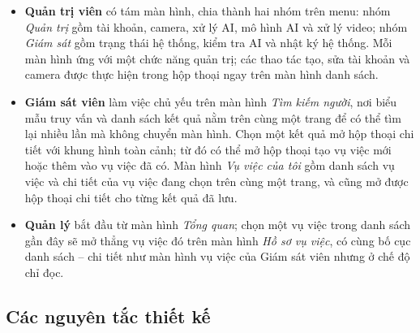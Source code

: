 \begin{itemize}
    \item \textbf{Quản trị viên} có tám màn hình, chia thành hai nhóm trên menu: nhóm \emph{Quản trị} gồm tài khoản, camera, xử lý AI, mô hình AI và xử lý video; nhóm \emph{Giám sát} gồm trạng thái hệ thống, kiểm tra AI và nhật ký hệ thống. Mỗi màn hình ứng với một chức năng quản trị; các thao tác tạo, sửa tài khoản và camera được thực hiện trong hộp thoại ngay trên màn hình danh sách.
    \item \textbf{Giám sát viên} làm việc chủ yếu trên màn hình \emph{Tìm kiếm người}, nơi biểu mẫu truy vấn và danh sách kết quả nằm trên cùng một trang để có thể tìm lại nhiều lần mà không chuyển màn hình. Chọn một kết quả mở hộp thoại chi tiết với khung hình toàn cảnh; từ đó có thể mở hộp thoại tạo vụ việc mới hoặc thêm vào vụ việc đã có. Màn hình \emph{Vụ việc của tôi} gồm danh sách vụ việc và chi tiết của vụ việc đang chọn trên cùng một trang, và cũng mở được hộp thoại chi tiết cho từng kết quả đã lưu.
    \item \textbf{Quản lý} bắt đầu từ màn hình \emph{Tổng quan}; chọn một vụ việc trong danh sách gần đây sẽ mở thẳng vụ việc đó trên màn hình \emph{Hồ sơ vụ việc}, có cùng bố cục danh sách -- chi tiết như màn hình vụ việc của Giám sát viên nhưng ở chế độ chỉ đọc.
\end{itemize}

\subsection{Các nguyên tắc thiết kế}
\label{sec:5.6.2}


